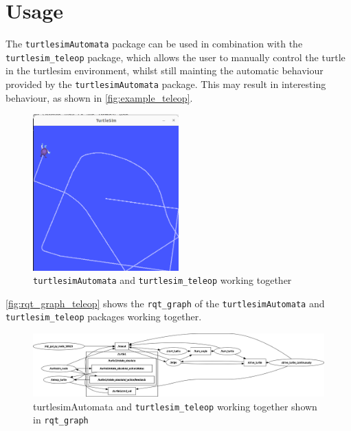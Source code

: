 \chapter{Usage}
\label{chapter:additional_functionalities}

The \texttt{turtlesimAutomata} package can be used in combination with the \texttt{turtlesim\_teleop} package, which allows the user to manually control the turtle in the turtlesim environment, whilst still mainting the automatic behaviour provided by the \texttt{turtlesimAutomata} package. This may result in interesting behaviour, as shown in \autoref{fig:example_teleop}.

\begin{figure}[htbp]
    \centering
    \includegraphics[width=0.5\textwidth]{./img/turtle_teleop_example.png}
    \caption{\texttt{turtlesimAutomata} and \texttt{turtlesim\_teleop} working together}
    \label{fig:example_teleop}
\end{figure}

\autoref{fig:rqt_graph_teleop} shows the \texttt{rqt\_graph} of the \texttt{turtlesimAutomata} and \texttt{turtlesim\_teleop} packages working together.

\begin{figure}[htbp]
    \centering
    \includegraphics[width=1\textwidth]{./img/rosgraph_teleop.png}
    \caption{turtlesimAutomata and \texttt{turtlesim\_teleop} working together shown in \texttt{rqt\_graph}}
    \label{fig:rqt_graph_teleop}
\end{figure}


